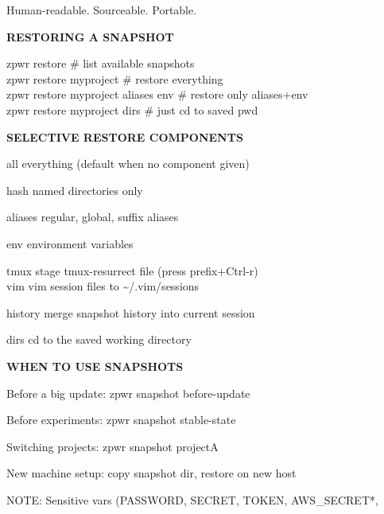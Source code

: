 \documentclass[11pt,a4paper,twoside]{book}
\begin{document}
Human-readable. Sourceable. Portable.


\vspace{12pt}
{\bfseries\color{neonyellow} RESTORING A SNAPSHOT}\vspace{4pt}

\begin{codebox}
zpwr restore                        \# list available snapshots\\
zpwr restore myproject               \# restore everything\\
zpwr restore myproject aliases env    \# restore only aliases+env\\
zpwr restore myproject dirs           \# just cd to saved pwd\\
\end{codebox}


\vspace{12pt}
{\bfseries\color{neonyellow} SELECTIVE RESTORE COMPONENTS}\vspace{4pt}

all       everything (default when no component given)

hash      named directories only

aliases   regular, global, suffix aliases

env       environment variables

\begin{codebox}
tmux      stage tmux-resurrect file (press prefix+Ctrl-r)\\
vim       vim session files to \textasciitilde{}/.vim/sessions\\
\end{codebox}

history   merge snapshot history into current session

dirs      cd to the saved working directory


\vspace{12pt}
{\bfseries\color{neonyellow} WHEN TO USE SNAPSHOTS}\vspace{4pt}

Before a big update:     zpwr snapshot before-update

Before experiments:      zpwr snapshot stable-state

Switching projects:      zpwr snapshot projectA

New machine setup:       copy snapshot dir, restore on new host

NOTE: Sensitive vars (PASSWORD, SECRET, TOKEN, AWS\_SECRET*,
\end{document}
